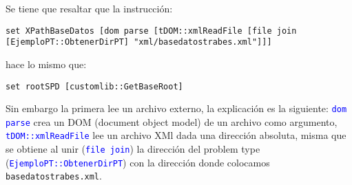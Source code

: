 \documentclass[10pt, a4paper, twocolumn]{article}
\begin{document}
Se tiene que resaltar que la instrucción:

\lstset{language=tcl} 
\begin{lstlisting}[caption={Obtener el nodo raíz del archivo \texttt{basedatostrabes.xml}.}]
	set XPathBaseDatos [dom parse [tDOM::xmlReadFile [file join [EjemploPT::ObtenerDirPT] "xml/basedatostrabes.xml"]]]
\end{lstlisting}

hace lo mismo que:

\lstset{language=tcl} 
\begin{lstlisting}[caption={Obtener el nodo raíz del archivo \texttt{EjemploPT\_default.spd}.}]
	set rootSPD [customlib::GetBaseRoot]
\end{lstlisting}

Sin embargo la primera lee un archivo externo, la explicación es la siguiente: \textcolor{blue}{\texttt{dom parse}} crea un DOM (document object model) de un archivo como argumento, \textcolor{blue}{\texttt{tDOM::xmlReadFile}} lee un archivo XMl dada una dirección absoluta, misma que se obtiene al unir (\textcolor{blue}{\texttt{file join}}) la dirección del problem type (\textcolor{blue}{\texttt{EjemploPT::ObtenerDirPT}}) con la dirección donde colocamos \texttt{basedatostrabes.xml}.
\end{document}
